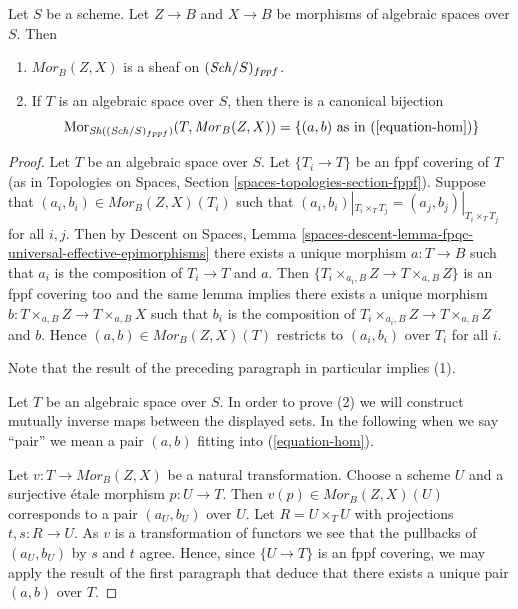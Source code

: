 \begin{lemma}
\label{lemma-hom-functor-sheaf}
Let $S$ be a scheme. Let $Z \to B$ and $X \to B$ be morphisms of
algebraic spaces over $S$. Then
\begin{enumerate}
\item $\mathit{Mor}_B(Z, X)$ is a sheaf on
$(\mathit{Sch}/S)_{fppf}$.
\item If $T$ is an algebraic space over $S$, then there is a
canonical bijection
$$
\mathop{\mathrm{Mor}}\nolimits_{\mathop{\mathit{Sh}}\nolimits((\mathit{Sch}/S)_{fppf})}(T, \mathit{Mor}_B(Z, X))
=
\{(a, b)\text{ as in }(\ref{equation-hom})\}
$$
\end{enumerate}
\end{lemma}

\begin{proof}
Let $T$ be an algebraic space over $S$. Let $\{T_i \to T\}$ be an fppf
covering of $T$ (as in
Topologies on Spaces, Section \ref{spaces-topologies-section-fppf}).
Suppose that $(a_i, b_i) \in \mathit{Mor}_B(Z, X)(T_i)$ such
that $(a_i, b_i)|_{T_i \times_T T_j} = (a_j, b_j)|_{T_i \times_T T_j}$
for all $i, j$. Then by
Descent on Spaces,
Lemma \ref{spaces-descent-lemma-fpqc-universal-effective-epimorphisms}
there exists a unique morphism $a : T \to B$ such that $a_i$ is the
composition of $T_i \to T$ and $a$. Then
$\{T_i \times_{a_i, B} Z \to T \times_{a, B} Z\}$ is an fppf covering
too and the same lemma implies there exists a unique morphism
$b : T \times_{a, B} Z \to T \times_{a, B} X$ such that $b_i$ is the
composition of $T_i \times_{a_i, B} Z \to T \times_{a, B} Z$ and $b$. Hence
$(a, b) \in \mathit{Mor}_B(Z, X)(T)$ restricts to $(a_i, b_i)$
over $T_i$ for all $i$.

\medskip\noindent
Note that the result of the preceding paragraph in particular implies (1).

\medskip\noindent
Let $T$ be an algebraic space over $S$. In order to prove (2) we will
construct mutually inverse maps between the displayed sets. In the
following when we say ``pair'' we mean a pair $(a, b)$ fitting
into (\ref{equation-hom}).

\medskip\noindent
Let $v : T \to \mathit{Mor}_B(Z, X)$ be a natural transformation.
Choose a scheme $U$ and a surjective \'etale morphism $p : U \to T$.
Then $v(p) \in \mathit{Mor}_B(Z, X)(U)$ corresponds to a pair $(a_U, b_U)$
over $U$. Let $R = U \times_T U$ with projections $t, s : R \to U$.
As $v$ is a transformation of functors we see that the pullbacks of
$(a_U, b_U)$ by $s$ and $t$ agree. Hence, since $\{U \to T\}$ is an
fppf covering, we may apply the result of the first paragraph that
deduce that there exists a unique pair $(a, b)$ over $T$.


\end{proof}
